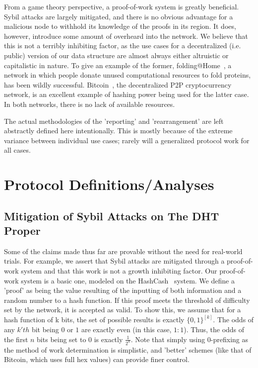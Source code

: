\documentclass[10pt]{IEEEtran}
\begin{document}
\par From a game theory perspective, a proof-of-work system is greatly beneficial. Sybil attacks are largely mitigated, and there is no obvious advantage for a malicious node to withhold its knowledge of the proofs in its region. It does, however, introduce some amount of overheard into the network. We believe that this is not a terribly inhibiting factor, as the use cases for a decentralized (i.e. public) version of our data structure are almost always either altruistic or capitalistic in nature. To give an example of the former, folding@Home~\cite{Anderson:2002vr}, a network in which people donate unused computational resources to fold proteins, has been wildly successful. Bitcoin~\cite{Nakamoto:2008ti}, the decentralized P2P cryptocurrency network, is an excellent example of hashing power being used for the latter case. In both networks, there is no lack of available resources.

\par The actual methodologies of the 'reporting' and 'rearrangement' are left abstractly defined here intentionally. This is mostly because of the extreme variance between individual use cases; rarely will a generalized protocol work for all cases.

\section{Protocol Definitions/Analyses}
\subsection{Mitigation of Sybil Attacks on The DHT Proper}
\par Some of the claims made thus far are provable without the need for real-world trials. For example, we assert that Sybil attacks are mitigated through a proof-of-work system and that this work is not a growth inhibiting factor. Our proof-of-work system is a basic one, modeled on the HashCash~\cite{Back:2002vq} system. We define a 'proof' as being the value resulting of the inputting of both information and a random number to a hash function. If this proof meets the threshold of difficulty set by the network, it is accepted as valid. To show this, we assume that for a hash function of k bits, the set of possible results is exactly $\{0,1\}^{[k]}$. The odds of any $k'th$ bit being $0$ or $1$ are exactly even (in this case, $1:1$). Thus, the odds of the first $n$ bits being set to 0 is exactly $\frac{1}{2^n}$. Note that simply using $0$-prefixing as the method of work determination is simplistic, and 'better' schemes (like that of Bitcoin, which uses full hex values) can provide finer control. 
\end{document}
